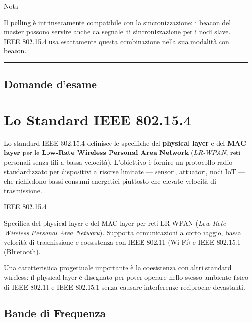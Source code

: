 \documentclass[
  italian,
  openany]{book}
\begin{document}
\begin{calloutnote}{Nota}

Il polling è intrinsecamente compatibile con la sincronizzazione: i
beacon del master possono servire anche da segnale di sincronizzazione
per i nodi slave. IEEE 802.15.4 usa esattamente questa combinazione
nella sua modalità con beacon.

\end{calloutnote}

\begin{center}\rule{0.5\linewidth}{0.5pt}\end{center}

\section{Domande d'esame}\label{domande-desame}

\newpage

\chapter{Lo Standard IEEE 802.15.4}\label{lo-standard-ieee-802.15.4}

Lo standard IEEE 802.15.4 definisce le specifiche del \textbf{physical
layer} e del \textbf{MAC layer} per le \textbf{Low-Rate Wireless
Personal Area Network} (\emph{LR-WPAN}, reti personali senza fili a
bassa velocità). L'obiettivo è fornire un protocollo radio
standardizzato per dispositivi a risorse limitate --- sensori,
attuatori, nodi IoT --- che richiedono bassi consumi energetici
piuttosto che elevate velocità di trasmissione.

\begin{calloutdefinition}{IEEE 802.15.4}

Specifica del physical layer e del MAC layer per reti LR-WPAN
(\emph{Low-Rate Wireless Personal Area Network}). Supporta comunicazioni
a corto raggio, bassa velocità di trasmissione e coesistenza con IEEE
802.11 (Wi-Fi) e IEEE 802.15.1 (Bluetooth).

\end{calloutdefinition}

Una caratteristica progettuale importante è la coesistenza con altri
standard wireless: il physical layer è disegnato per poter operare nello
stesso ambiente fisico di IEEE 802.11 e IEEE 802.15.1 senza causare
interferenze reciproche devastanti.

\section{Bande di Frequenza}\label{bande-di-frequenza}
\end{document}
